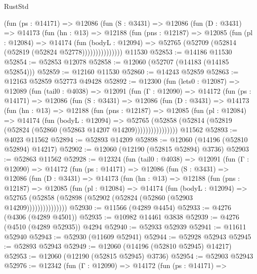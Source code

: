 \begin{lexlean}{RustStd}
\begin{coremodule}
            (fun (ps : @14171) =>
            @12086
              (fun (S : @3431) =>
              @12086
                (fun (D : @3431) =>
                @14173
                  (fun (hn : @13) =>
                  @12188
                    (fun (pns : @12187) =>
                    @12085
                      (fun (pl : @12084) =>
                      @14174
                        (fun (bodyL : @12094) =>
                        @52765 (@52709 (@52814 (@52819 (@52824 @52778)))))))))))))))
    @11530
@52853 := @14186 @11530
@52854 := @52853 @12078
@52858 := @12060 (@52707 (@14183 (@14185 @52854)))
@52859 := @12160 @11530
@52860 := @14243 @52859
@52863 := @12163 @52859 @52773 @49428
@52892 := @12300
    (fun (lets0 : @12087) =>
    @12089
      (fun (tail0 : @4038) =>
      @12091
        (fun (Γ : @12090) =>
        @14172
          (fun (ps : @14171) =>
          @12086
            (fun (S : @3431) =>
            @12086
              (fun (D : @3431) =>
              @14173
                (fun (hn : @13) =>
                @12188
                  (fun (pns : @12187) =>
                  @12085
                    (fun (pl : @12084) =>
                    @14174
                      (fun (bodyL : @12094) =>
                      @52765
                        (@52858
                          (@52814 (@52819 (@52824 (@52860 (@52863 @14207 @14209))))))))))))))))
    @11562
@52893 := @4023 @11562
@52894 := @52893 @14209
@52898 := @12060 (@14196 (@52810 @52894) @14217)
@52902 := @12060 (@12190 (@52815 @52894) @3736)
@52903 := @52863 @11562
@52928 := @12324
    (fun (tail0 : @4038) =>
    @12091
      (fun (Γ : @12090) =>
      @14172
        (fun (ps : @14171) =>
        @12086
          (fun (S : @3431) =>
          @12086
            (fun (D : @3431) =>
            @14173
              (fun (hn : @13) =>
              @12188
                (fun (pns : @12187) =>
                @12085
                  (fun (pl : @12084) =>
                  @14174
                    (fun (bodyL : @12094) =>
                    @52765 (@52858 (@52898 (@52902 (@52824 (@52860 (@52903 @14209)))))))))))))))
@52930 := @11566 (@4289 @4454)
@52933 := @4276 (@4306 (@4289 @4501))
@52935 := @10982 @14461 @3838
@52939 := @4276 (@4510 (@4289 @52935)) @4294
@52940 := @52933 @52939
@52941 := @11611 @52940
@52943 := @52930 (@11609 @52941)
@52944 := @52928 @52943
@52945 := @52893 @52943
@52949 := @12060 (@14196 (@52810 @52945) @14217)
@52953 := @12060 (@12190 (@52815 @52945) @3736)
@52954 := @52903 @52943
@52976 := @12342
    (fun (Γ : @12090) =>
    @14172
      (fun (ps : @14171) =>

\end{coremodule}
\end{lexlean}
